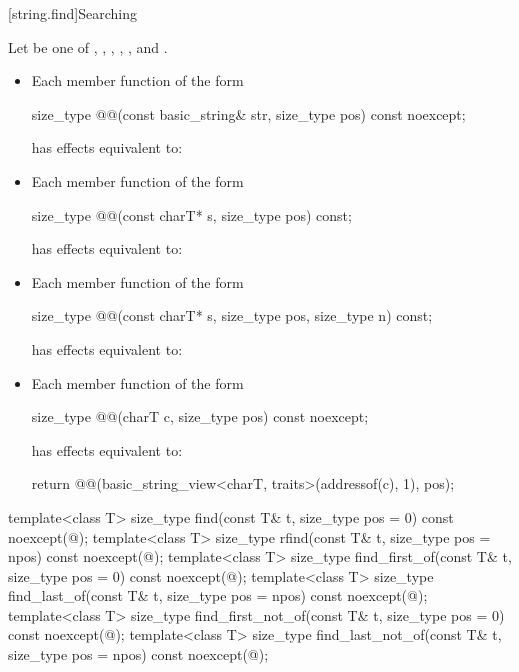 [string.find]{Searching}

\pnum
Let  be one of
, , , ,
, and .

\begin{itemize}
\item
Each member function of the form
\begin{codeblock}
size_type @@(const basic_string& str, size_type pos) const noexcept;
\end{codeblock}
has effects equivalent to:

\item
Each member function of the form
\begin{codeblock}
size_type @@(const charT* s, size_type pos) const;
\end{codeblock}
has effects equivalent to:

\item
Each member function of the form
\begin{codeblock}
size_type @@(const charT* s, size_type pos, size_type n) const;
\end{codeblock}
has effects equivalent to:

\item
Each member function of the form
\begin{codeblock}
size_type @@(charT c, size_type pos) const noexcept;
\end{codeblock}
has effects equivalent to:
\begin{codeblock}
return @@(basic_string_view<charT, traits>(addressof(c), 1), pos);
\end{codeblock}
\end{itemize}

%
%
%
%
%
%
\begin{itemdecl}
template<class T>
  size_type find(const T& t, size_type pos = 0) const noexcept(@\seebelow@);
template<class T>
  size_type rfind(const T& t, size_type pos = npos) const noexcept(@\seebelow@);
template<class T>
  size_type find_first_of(const T& t, size_type pos = 0) const noexcept(@\seebelow@);
template<class T>
  size_type find_last_of(const T& t, size_type pos = npos) const noexcept(@\seebelow@);
template<class T>
  size_type find_first_not_of(const T& t, size_type pos = 0) const noexcept(@\seebelow@);
template<class T>
  size_type find_last_not_of(const T& t, size_type pos = npos) const noexcept(@\seebelow@);
\end{itemdecl}

